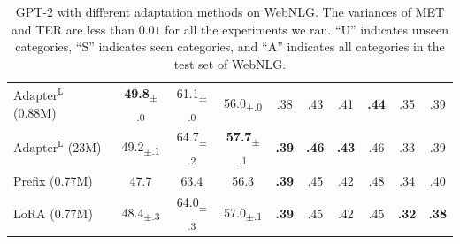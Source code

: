\documentclass{article} %
\begin{document}
\begin{table}[h]
\begin{tabular}{l|ccc|ccc|ccc}
$\text{Adapter}^{\text{L}}$ (0.88M)  & \textbf{49.8}\textsubscript{$\pm$.0}  & 61.1\textsubscript{$\pm$.0}           & 56.0\textsubscript{$\pm$.0}           & .38           & .43           & .41           & \textbf{.44}  & .35           &  .39 \\
$\text{Adapter}^{\text{L}}$ (23M)   & 49.2\textsubscript{$\pm$.1}           & 64.7\textsubscript{$\pm$.2}           & \textbf{57.7}\textsubscript{$\pm$.1}  & \textbf{.39}  & \textbf{.46}  & \textbf{.43}  & .46           & .33           &  .39 \\
Prefix (0.77M)                      & 47.7                                  & 63.4                                  & 56.3                                  & \textbf{.39}  & .45           & .42           & .48           & .34           & .40 \\
LoRA (0.77M)                        & 48.4\textsubscript{$\pm$.3}           & 64.0\textsubscript{$\pm$.3}           & 57.0\textsubscript{$\pm$.1}           & \textbf{.39}  & .45           & .42           & .45           & \textbf{.32}  & \textbf{.38} \\
\bottomrule
\end{tabular}
\caption{GPT-2 with different adaptation methods on WebNLG. The variances of MET and TER are less than $0.01$ for all the experiments we ran. ``U'' indicates unseen categories, ``S'' indicates seen categories, and ``A'' indicates all categories in the test set of WebNLG.}
\label{tab:gpt2_ft_webnlg}
\end{table}
\end{document}
